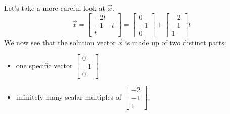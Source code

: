 \documentclass{ximera}
\begin{document}
\begin{exploration}
 Let's take a more careful look at $\vec{x}$.
 $$\vec{x}=\begin{bmatrix}-2t\\-1-t\\t\end{bmatrix}=\begin{bmatrix}0\\-1\\0\end{bmatrix}+\begin{bmatrix}-2\\-1\\1\end{bmatrix}t$$
 We now see that the solution vector $\vec{x}$ is made up of two distinct parts: 
 \begin{itemize}
 \item
 one specific vector $\begin{bmatrix}0\\-1\\0\end{bmatrix}$
 \item
 infinitely many scalar multiples of $\begin{bmatrix}-2\\-1\\1\end{bmatrix}$.  
 \end{itemize}
 

\end{exploration}
\end{document}
